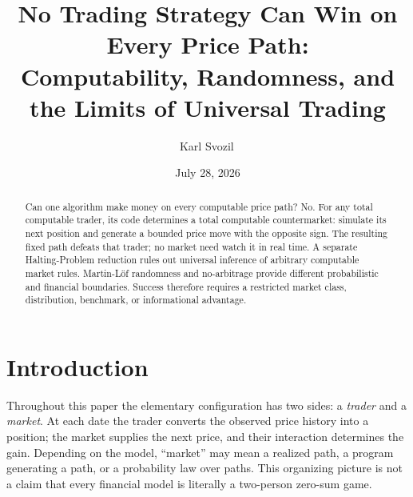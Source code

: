 \documentclass[aps,pra,reprint,superscriptaddress,amsmath,amssymb,floatfix]{revtex4-2}
\theoremstyle{plain}
\theoremstyle{definition}
\theoremstyle{remark}
\begin{document}
\title{No Trading Strategy Can Win on Every Price Path:\\
Computability, Randomness, and the Limits of Universal Trading}

\author{Karl Svozil\,}

\date{July 28, 2026}

\begin{abstract}
Can one algorithm make money on every computable price path? No. For any total
computable trader, its code determines a total computable countermarket:
simulate its next position and generate a bounded price move with the opposite
sign. The resulting fixed path defeats that trader; no market need watch it in
real time. A separate Halting-Problem reduction rules out universal inference
of arbitrary computable market rules. Martin-L\"of randomness and
no-arbitrage provide different probabilistic and financial boundaries.
Success therefore requires a restricted market class, distribution, benchmark,
or informational advantage.
\end{abstract}

\maketitle

\section{Introduction}
\label{sec:intro}

Throughout this paper the elementary configuration has two sides: a
\emph{trader} and a \emph{market}. At each date the trader converts the
observed price history into a position; the market supplies the next price,
and their interaction determines the gain. Depending on the model, ``market''
may mean a realized path, a program generating a path, or a probability law
over paths. This organizing picture is not a claim that every financial model
is literally a two-person zero-sum game.
\end{document}
